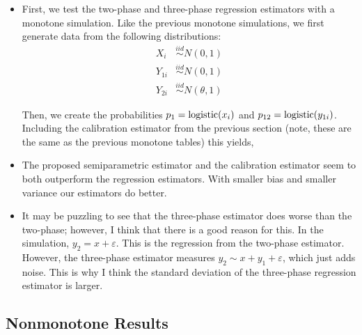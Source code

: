 \begin{itemize}
  \item First, we test the two-phase and three-phase regression estimators with
    a monotone simulation. Like the previous monotone simulations,
    we first generate data from the following distributions:
    \begin{align*}
        X_i &\stackrel{iid}{\sim} N(0, 1) \\
        Y_{1i} &\stackrel{iid}{\sim} N(0, 1)\\
        Y_{2i} &\stackrel{iid}{\sim} N(\theta, 1)
    \end{align*}

    Then, we create the probabilities $p_1 = {\text{logistic}}(x_i)$ and 
    $p_{12} = {\text{logistic}}(y_{1i})$. Including the calibration estimator from the
    previous section (note, these are the same as the previous monotone tables)
    this yields,

    
    
    

  \item The proposed semiparametric estimator and the calibration estimator
    seem to both outperform the regression estimators. With smaller bias and
    smaller variance our estimators do better.

  \item It may be puzzling to see that the three-phase estimator does worse than
    the two-phase; however, I think that there is a good reason for this. In the
    simulation, $y_2 = x + \varepsilon$. This is the regression from the
    two-phase estimator. However, the three-phase estimator measures $y_2 \sim x
    + y_1 + \varepsilon$, which just adds noise. This is why I think the
    standard deviation of the three-phase regression estimator is larger.
  
\end{itemize}

\subsection*{Nonmonotone Results}

